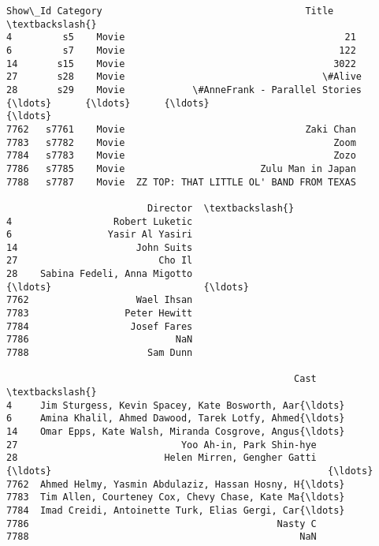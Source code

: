 \documentclass[11pt]{article}
\makeatletter
\newcommand{\boxspacing}{\kern\kvtcb@left@rule\kern\kvtcb@boxsep}
\newcommand{\prompt}[4]{
        {\ttfamily\llap{{\color{#2}[#3]:\hspace{3pt}#4}}\vspace{-\baselineskip}}
    }
\makeatother
\begin{document}
            \begin{tcolorbox}[breakable, size=fbox, boxrule=.5pt, pad at break*=1mm, opacityfill=0]
\prompt{Out}{outcolor}{29}{\boxspacing}
\begin{Verbatim}[commandchars=\\\{\}]
     Show\_Id Category                                    Title  \textbackslash{}
4         s5    Movie                                       21
6         s7    Movie                                      122
14       s15    Movie                                     3022
27       s28    Movie                                   \#Alive
28       s29    Movie            \#AnneFrank - Parallel Stories
{\ldots}      {\ldots}      {\ldots}                                      {\ldots}
7762   s7761    Movie                                Zaki Chan
7783   s7782    Movie                                     Zoom
7784   s7783    Movie                                     Zozo
7786   s7785    Movie                        Zulu Man in Japan
7788   s7787    Movie  ZZ TOP: THAT LITTLE OL' BAND FROM TEXAS

                         Director  \textbackslash{}
4                  Robert Luketic
6                 Yasir Al Yasiri
14                     John Suits
27                         Cho Il
28    Sabina Fedeli, Anna Migotto
{\ldots}                           {\ldots}
7762                   Wael Ihsan
7783                 Peter Hewitt
7784                  Josef Fares
7786                          NaN
7788                     Sam Dunn

                                                   Cast  \textbackslash{}
4     Jim Sturgess, Kevin Spacey, Kate Bosworth, Aar{\ldots}
6     Amina Khalil, Ahmed Dawood, Tarek Lotfy, Ahmed{\ldots}
14    Omar Epps, Kate Walsh, Miranda Cosgrove, Angus{\ldots}
27                             Yoo Ah-in, Park Shin-hye
28                          Helen Mirren, Gengher Gatti
{\ldots}                                                 {\ldots}
7762  Ahmed Helmy, Yasmin Abdulaziz, Hassan Hosny, H{\ldots}
7783  Tim Allen, Courteney Cox, Chevy Chase, Kate Ma{\ldots}
7784  Imad Creidi, Antoinette Turk, Elias Gergi, Car{\ldots}
7786                                            Nasty C
7788                                                NaN


\end{Verbatim}
\end{tcolorbox}
\end{document}
